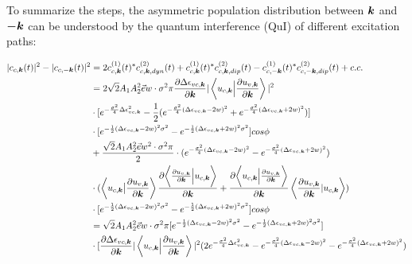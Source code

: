 To summarize the steps, the asymmetric population distribution between $\boldsymbol k$ and $\boldsymbol {-k}$  can be understood by the quantum interference (\gls{QuI}) of different excitation paths:

\begin{equation}
    \begin{aligned}
    |c_{c,\vecb k}(t)|^2-|c_{c,-\vecb k}(t)|^2&=
 2c^{(1)}_{c,\vecb k}(t)^* c^{(2)}_{c,\vecb k,dyn}(t) +c^{(1)}_{c,\vecb k}(t)^* c^{(2)}_{c,\vecb k,dip}(t)-c^{(1)}_{c,-\vecb k}(t)^* c^{(2)}_{c,-\vecb k,dip}(t) + c.c.\\
 &=2\sqrt{2} A_1 A_2^2 \vec e w \cdot \sigma^2 \pi \frac{\partial  \Delta \epsilon_{vc,\vecb k}}{\partial \vecb k} |\left \langle u_{c,\vecb k}\Big |\frac{\partial u_{v,\vecb k}}{\partial \vecb k} \right \rangle|^2 \\
    &\cdot [e^{-\frac{\sigma^2}{4} \Delta \epsilon_{vc,\vecb k} ^2}-\frac{1}{2}(e^{-\frac{\sigma^2}{4} (\Delta \epsilon_{vc,\vecb k}-2w)^2}+e^{-\frac{\sigma^2}{4} (\Delta \epsilon_{vc,\vecb k}+2w)^2})]\\
    &\cdot[e^{-\frac{1}2{}(\Delta \epsilon_{vc,\vecb k} - 2w)^2 \sigma^2}
    -e^{-\frac{1}{2}(\Delta \epsilon_{vc,\vecb k} + 2w)^2 \sigma^2} ]cos\phi\\
    &+\frac{\sqrt{2}A_1A_2^2 \vec e w^2 \cdot \sigma^2 \pi}{2}\cdot(e^{-\frac{\sigma^2}{4} (\Delta \epsilon_{vc,\vecb k}-2w)^2}-e^{-\frac{\sigma^2}{4} (\Delta \epsilon_{vc,\vecb k}+2w)^2})\\
    &\cdot (\left \langle u_{c,\vecb k} \big | \frac{\partial u_{v,\vecb k}}{\partial \vecb k}  \right \rangle \frac{\partial{\left \langle\frac{\partial u_{v,\vecb k}}{\partial \vecb k}\Big |u_{c,\vecb k}\right \rangle}}{\partial {\vecb k}} +
   \frac{\partial{\left \langle u_{c,\vecb k}\Big |\frac{\partial u_{v,\vecb k}}{\partial \vecb k} \right \rangle}}{\partial {\vecb k}}
    \left \langle \frac{\partial u_{v,\vecb k}}{\partial \vecb k} |  u_{c,\vecb k} \right \rangle)\\
    &\cdot[e^{-\frac{1}{2}(\Delta \epsilon_{vc,\vecb k} - 2w)^2 \sigma^2}
    -e^{-\frac{1}{2}(\Delta \epsilon_{vc,\vecb k} + 2w)^2 \sigma^2} ]cos\phi\\
    &=\sqrt{2} A_1 A_2^2 \vec e w \cdot \sigma^2 \pi [e^{-\frac{1}2{}(\Delta \epsilon_{vc,\vecb k} - 2w)^2 \sigma^2}
    -e^{-\frac{1}{2}(\Delta \epsilon_{vc,\vecb k} + 2w)^2 \sigma^2} ]\\
    &\cdot[\frac{\partial  \Delta \epsilon_{vc,\vecb k}}{\partial \vecb k} |\left \langle u_{c,\vecb k}\Big |\frac{\partial u_{v,\vecb k}}{\partial \vecb k} \right \rangle|^2 (2e^{-\frac{\sigma^2}{4} \Delta \epsilon_{vc,\vecb k} ^2}-e^{-\frac{\sigma^2}{4} (\Delta \epsilon_{vc,\vecb k}-2w)^2}-e^{-\frac{\sigma^2}{4} (\Delta \epsilon_{vc,\vecb k}+2w)^2})\\

\end{aligned}
\end{equation}
